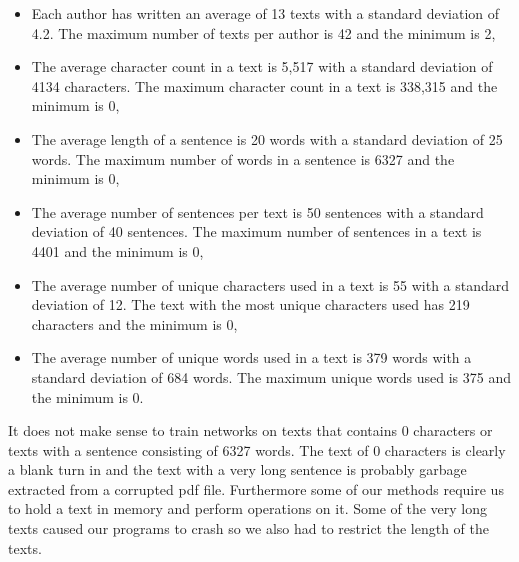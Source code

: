 \begin{itemize}

    \item

        Each author has written an average of 13 texts with a standard deviation
        of 4.2. The maximum number of texts per author is 42 and the minimum is
        2,

    \item

        The average character count in a text is 5,517 with a standard deviation
        of 4134 characters. The maximum character count in a text is 338,315 and
        the minimum is 0,

    \item

        The average length of a sentence is 20 words with a standard deviation
        of 25 words. The maximum number of words in a sentence is 6327 and the
        minimum is 0,

    \item

        The average number of sentences per text is 50 sentences with a standard
        deviation of 40 sentences. The maximum number of sentences in a text is
        4401 and the minimum is 0,

    \item

        The average number of unique characters used in a text is 55 with a
        standard deviation of 12. The text with the most unique characters used
        has 219 characters and the minimum is 0,

    \item

        The average number of unique words used in a text is 379 words with a
        standard deviation of 684 words. The maximum unique words used is 375
        and the minimum is 0.

\end{itemize}

It does not make sense to train networks on texts that contains 0 characters
or texts with a sentence consisting of 6327 words. The text of 0 characters
is clearly a blank turn in and the text with a very long sentence is probably
garbage extracted from a corrupted pdf file. Furthermore some of our methods
require us to hold a text in memory and perform operations on it. Some of the
very long texts caused our programs to crash so we also had to restrict the
length of the texts.

